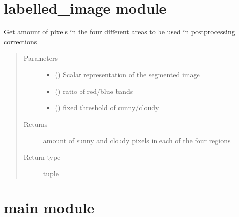 \documentclass[letterpaper,10pt,english]{sphinxmanual}
\begin{document}
\section{labelled\_image module}
\label{\detokenize{labelled_image:module-labelled_image}}\label{\detokenize{labelled_image::doc}}\label{\detokenize{labelled_image:labelled-image-module}}

\begin{fulllineitems}
\label{\detokenize{labelled_image:labelled_image.calculate_pixels}}
Get amount of pixels in the four different areas to be used in postprocessing corrections
\begin{quote}\begin{description}
\item[{Parameters}] \leavevmode\begin{itemize}
\item {} 
 () \textendash{} Scalar representation of the segmented image

\item {} 
 () \textendash{} ratio of red/blue bands

\item {} 
 () \textendash{} fixed threshold of sunny/cloudy

\end{itemize}

\item[{Returns}] \leavevmode
amount of sunny and cloudy pixels in each of the four regions

\item[{Return type}] \leavevmode
tuple

\end{description}\end{quote}

\end{fulllineitems}



\section{main module}
\label{\detokenize{main:module-main}}\label{\detokenize{main:main-module}}\label{\detokenize{main::doc}}
\end{document}

